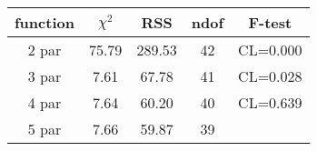 \begin{tabular}{c|c|c|c|c}
function & $\chi^2$ & RSS & ndof & F-test \\
\hline
2 par & 75.79 & 289.53 & 42 & CL=0.000 \\
3 par & 7.61 & 67.78 & 41 & CL=0.028 \\
4 par & 7.64 & 60.20 & 40 & CL=0.639 \\
5 par & 7.66 & 59.87 & 39 & \\
\hline
\end{tabular}